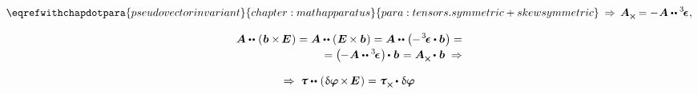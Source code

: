 \begin{otherlanguage}{russian}
\noindent
{}

\nopagebreak\vspace{-1em}\begin{equation*}
\eqrefwithchapdotpara{pseudovectorinvariant}{chapter:mathapparatus}{para:tensors.symmetric+skewsymmetric}
\:\Rightarrow\,
\bm{A}_{\Xcompanion} \hspace{-0.1ex} = - \hspace{.1ex} \bm{A} \dotdotp \permutationsparitytensor
\hspace{.1ex} ,
\end{equation*}

\nopagebreak\vspace{-0.5em}\begin{multline*}
\bm{A} \dotdotp \hspace{-0.25ex} \left( \hspace{.1ex} \bm{b} \times \hspace{-0.2ex} \UnitDyad \hspace{.1ex} \right)
= \bm{A} \dotdotp \hspace{-0.32ex} \left( \hspace{.1ex} \UnitDyad \hspace{-0.12ex} \times \bm{b} \hspace{.1ex} \right)
= \bm{A} \dotdotp \hspace{-0.32ex} \left( \hspace{-0.1ex} - \hspace{.2ex} \permutationsparitytensor \dotp \bm{b} \hspace{.1ex} \right) =
\\[-0.2em]
%
\hspace*{\fill} = \left( \hspace{-0.1ex} - \hspace{.1ex} \bm{A} \dotdotp \permutationsparitytensor \hspace{.1ex} \right) \hspace{-0.2ex} \dotp \hspace{.1ex} \bm{b}
\hspace{.12ex} = \bm{A}_{\Xcompanion} \hspace{-0.1ex} \dotp \hspace{.1ex} \bm{b}
\hspace{.64ex} \Rightarrow
\end{multline*}

\nopagebreak\vspace{-0.4em}\begin{equation*}
\Rightarrow \hspace{.64ex}
\forcestresstensor \dotdotp \hspace{-0.25ex} \left( \hspace{.12ex} \variation{\fieldofrotations} \hspace{-0.2ex} \times \hspace{-0.2ex} \UnitDyad \hspace{.12ex} \right)
= \forcestresstensor_{\Xcompanion} \hspace{-0.1ex} \dotp \hspace{.1ex} \variation{\fieldofrotations}
\end{equation*}


\end{otherlanguage}
